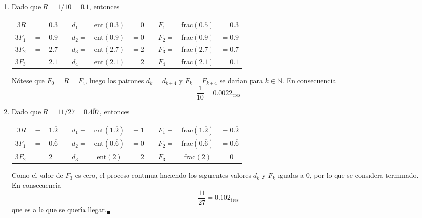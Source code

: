\begin{solucion}
\begin{enumerate}
  \item Dado que $R = 1/10 = 0.1$, entonces 
  \begin{center}
   \begin{tabular}{rclcrclcrcl}
    $3R$ & $=$ & $0.3$ & \hspace{1.5cm} & $d_1 =$ & ent$(0.3)$ & $=0$ & \hspace{1.5cm} & $F_1=$ & frac$(0.5)$ & $=0.3$ \\
    $3F_1$ & $=$ & $0.9$ & & $d_2 =$ & ent$(0.9)$ & $=0$ & & $F_2=$ & frac$(0.9)$ & $=0.9$ \\
    $3F_2$ & $=$ & $2.7$ & & $d_3 =$ & ent$(2.7)$ & $=2$ & & $F_3 =$ & frac$(2.7)$ & $=0.7$ \\
    $3F_3$ & $=$ & $2.1$ & & $d_4 =$ & ent$(2.1)$ & $=2$ & & $F_4=$ & frac$(2.1)$ & $=0.1$
   \end{tabular}
  \end{center}
  N\'otese que $F_0 = R = F_4$, luego los patrones $d_k = d_{k+4}$ y $F_k = F_{k+4}$ se dar\'{\i}an para $k\in\mathbb{N}$. En consecuencia
  \begin{equation*}
   \frac{1}{10} = 0.\overline{0022}_{\text{tres}}
  \end{equation*}

  \item Dado que $R = 11/27 = 0.\overline{407}$, entonces 
  \begin{center}
   \begin{tabular}{rclcrclcrcl}
    $3R$ & $=$ & $1.\overline{2}$ & \hspace{1.5cm} & $d_1 =$ & ent$\left( 1.\overline{2} \right)$ & $=1$ & \hspace{1.5cm} & $F_1=$ & frac$\left( 1.\overline{2} \right)$ & $=0.\overline{2}$ \\
    $3F_1$ & $=$ & $0.\overline{6}$ & & $d_2 =$ & ent$\left( 0.\overline{6} \right)$ & $=0$ & & $F_2=$ & frac$\left( 0.\overline{6} \right)$ & $=0.\overline{6}$ \\
    $3F_2$ & $=$ & $2$ & & $d_3 =$ & ent$(2)$ & $=2$ & & $F_3 =$ & frac$(2)$ & $=0$
   \end{tabular}
  \end{center}
  Como el valor de $F_3$ es cero, el proceso continua haciendo los siguientes valores $d_k$ y $F_k$ iguales a $0$, por lo que se considera terminado. En consecuencia
  \begin{equation*}
   \frac{11}{27} = 0.102_{\text{tres}}
  \end{equation*}
  que es a lo que se quer\'{\i}a llegar.${}_{\blacksquare}$
 \end{enumerate}
\end{solucion}
